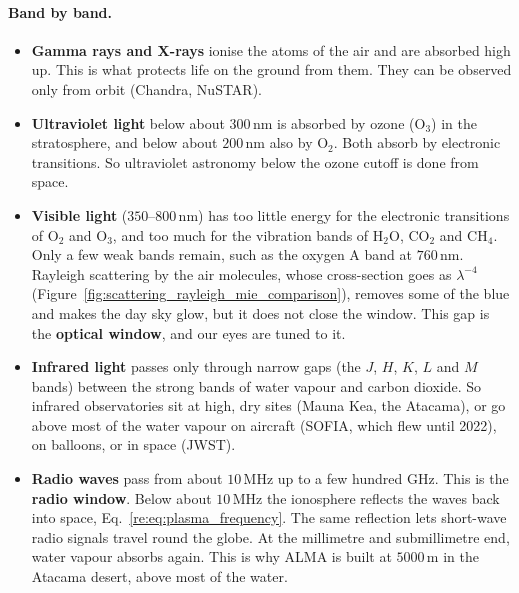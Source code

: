 \paragraph{Band by band.}
\begin{itemize}
	\item \textbf{Gamma rays and X-rays} ionise the atoms of the air and are absorbed high up. This is what protects life on the ground from them. They can be observed only from orbit (Chandra, NuSTAR).
	\item \textbf{Ultraviolet light} below about $300\,\mathrm{nm}$ is absorbed by ozone ($\mathrm O_3$) in the stratosphere, and below about $200\,\mathrm{nm}$ also by $\mathrm O_2$. Both absorb by electronic transitions. So ultraviolet astronomy below the ozone cutoff is done from space.
	\item \textbf{Visible light} ($350$--$800\,\mathrm{nm}$) has too little energy for the electronic transitions of $\mathrm O_2$ and $\mathrm O_3$, and too much for the vibration bands of $\mathrm H_2\mathrm O$, $\mathrm{CO}_2$ and $\mathrm{CH}_4$. Only a few weak bands remain, such as the oxygen A band at $760\,\mathrm{nm}$. Rayleigh scattering by the air molecules, whose cross-section goes as $\lambda^{-4}$ (Figure~\ref{fig:scattering_rayleigh_mie_comparison}), removes some of the blue and makes the day sky glow, but it does not close the window. This gap is the \textbf{optical window}, and our eyes are tuned to it.
	\item \textbf{Infrared light} passes only through narrow gaps (the $J$, $H$, $K$, $L$ and $M$ bands) between the strong bands of water vapour and carbon dioxide. So infrared observatories sit at high, dry sites (Mauna Kea, the Atacama), or go above most of the water vapour on aircraft (SOFIA, which flew until 2022), on balloons, or in space (JWST).
	\item \textbf{Radio waves} pass from about $10\,\mathrm{MHz}$ up to a few hundred GHz. This is the \textbf{radio window}. Below about $10\,\mathrm{MHz}$ the ionosphere reflects the waves back into space, Eq.~\eqref{re:eq:plasma_frequency}. The same reflection lets short-wave radio signals travel round the globe. At the millimetre and submillimetre end, water vapour absorbs again. This is why ALMA is built at $5000\,\mathrm m$ in the Atacama desert, above most of the water.
\end{itemize}

